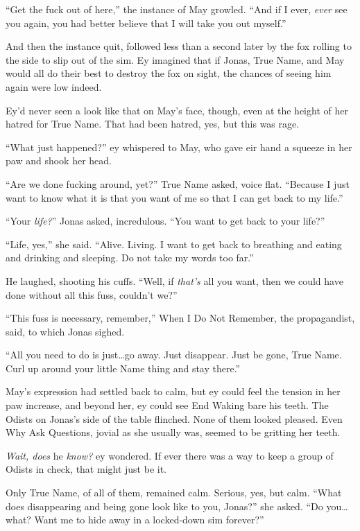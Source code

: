 ``Get the fuck out of here,'' the instance of May growled. ``And if I ever, \emph{ever} see you again, you had better believe that I will take you out myself.''

And then the instance quit, followed less than a second later by the fox rolling to the side to slip out of the sim. Ey imagined that if Jonas, True Name, and May would all do their best to destroy the fox on sight, the chances of seeing him again were low indeed.

Ey'd never seen a look like that on May's face, though, even at the height of her hatred for True Name. That had been hatred, yes, but this was rage.

``What just happened?'' ey whispered to May, who gave eir hand a squeeze in her paw and shook her head.

``Are we done fucking around, yet?'' True Name asked, voice flat. ``Because I just want to know what it is that you want of me so that I can get back to my life.''

``Your \emph{life?}'' Jonas asked, incredulous. ``You want to get back to your life?''

``Life, yes,'' she said. ``Alive. Living. I want to get back to breathing and eating and drinking and sleeping. Do not take my words too far.''

He laughed, shooting his cuffs. ``Well, if \emph{that's} all you want, then we could have done without all this fuss, couldn't we?''

``This fuss is necessary, remember,'' When I Do Not Remember, the propagandist, said, to which Jonas sighed.

``All you need to do is just\ldots go away. Just disappear. Just be gone, True Name. Curl up around your little Name thing and stay there.''

May's expression had settled back to calm, but ey could feel the tension in her paw increase, and beyond her, ey could see End Waking bare his teeth. The Odists on Jonas's side of the table flinched. None of them looked pleased. Even Why Ask Questions, jovial as she usually was, seemed to be gritting her teeth.

\emph{Wait, does} he \emph{know?} ey wondered. If ever there was a way to keep a group of Odists in check, that might just be it.

Only True Name, of all of them, remained calm. Serious, yes, but calm. ``What does disappearing and being gone look like to you, Jonas?'' she asked. ``Do you\ldots what? Want me to hide away in a locked-down sim forever?''

